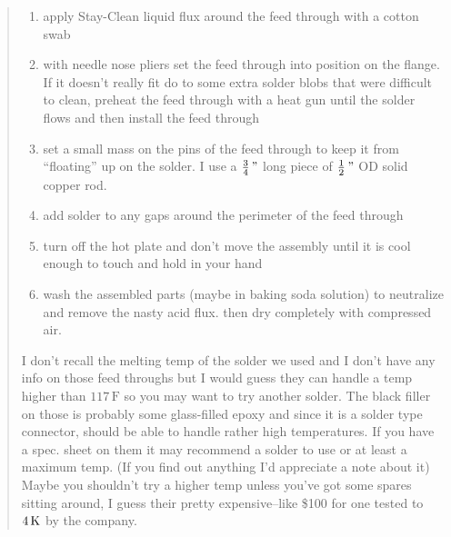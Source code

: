 \begin{quotation}
\begin{enumerate}
\item apply Stay-Clean liquid flux around the feed through with a cotton swab

\item  with needle nose pliers set the feed through into position on the flange. 
If it doesn't really fit do to some extra solder blobs that were difficult
to clean, preheat the feed through with a heat gun until the solder flows and
then install the feed through

\item  set a small mass on the pins of the feed through to keep it from ``floating''
up on the solder. I use a $\frac{3}{4}\,\inch$ long piece of 
$\frac{1}{2}\,\inch$ OD solid copper rod.

\item  add solder to any gaps around the perimeter of the feed through

\item  turn off the hot plate and don't move the assembly until it is cool
enough to touch and hold in your hand

\item  wash the assembled parts (maybe in baking soda solution) to neutralize
and remove the nasty acid flux. then dry completely with compressed air.

\end{enumerate}

I don't recall the melting temp of the solder we used and I don't have any
info on those feed throughs but I would guess they can handle a temp higher
than $117\,\mathrm{F}$ 
so you may want to try another solder.  The black filler on
those is probably some glass-filled epoxy and since it is a solder type
connector, should be able to handle rather high temperatures.  If you have
a spec. sheet on them it may recommend a solder to use or at least a maximum
temp. (If you find out anything I'd appreciate a note about it)  Maybe you
shouldn't try a higher temp unless you've got some spares sitting around,
I guess their pretty expensive--like \$100 for one tested to 
$4\,\kelvin$ by the company.


\end{quotation}
